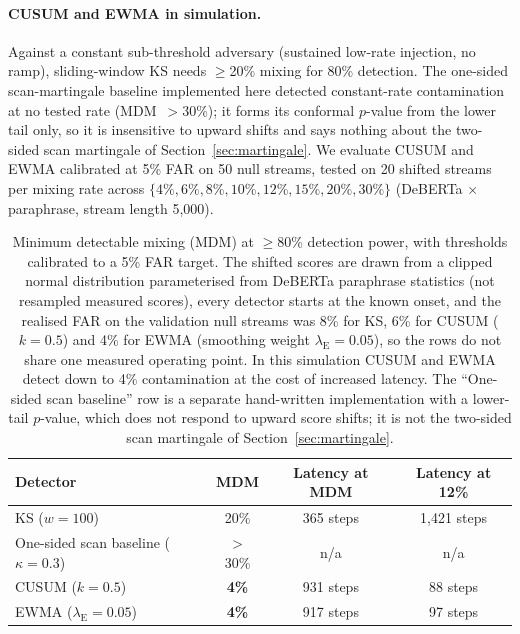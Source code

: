 \documentclass{article}
\begin{document}
\paragraph{CUSUM and EWMA in simulation.} Against a constant sub-threshold adversary (sustained low-rate injection, no ramp), sliding-window KS needs $\geq$20\% mixing for 80\% detection. The one-sided scan-martingale baseline implemented here detected constant-rate contamination at no tested rate (MDM~$>$30\%); it forms its conformal $p$-value from the lower tail only, so it is insensitive to upward shifts and says nothing about the two-sided scan martingale of Section~\ref{sec:martingale}. We evaluate CUSUM and EWMA calibrated at 5\% FAR on 50 null streams, tested on 20 shifted streams per mixing rate across $\{4\%, 6\%, 8\%, 10\%, 12\%, 15\%, 20\%, 30\%\}$ (DeBERTa $\times$ paraphrase, stream length 5{,}000).

\begin{table}[h]
\centering
\small
\caption{Minimum detectable mixing (MDM) at $\geq$80\% detection power, with thresholds calibrated to a 5\% FAR target. The shifted scores are drawn from a clipped normal distribution parameterised from DeBERTa paraphrase statistics (not resampled measured scores), every detector starts at the known onset, and the realised FAR on the validation null streams was 8\% for KS, 6\% for CUSUM ($k{=}0.5$) and 4\% for EWMA (smoothing weight $\lambda_{\text{E}}{=}0.05$), so the rows do not share one measured operating point. In this simulation CUSUM and EWMA detect down to 4\% contamination at the cost of increased latency. The ``One-sided scan baseline'' row is a separate hand-written implementation with a lower-tail $p$-value, which does not respond to upward score shifts; it is not the two-sided scan martingale of Section~\ref{sec:martingale}.}
\label{tab:subthreshold}
\begin{tabular}{lccc}
\toprule
\textbf{Detector} & \textbf{MDM} & \textbf{Latency at MDM} & \textbf{Latency at 12\%} \\
\midrule
KS ($w{=}100$) & 20\% & 365 steps & 1{,}421 steps \\
One-sided scan baseline ($\kappa{=}0.3$) & $>$30\% & n/a & n/a \\
CUSUM ($k{=}0.5$) & \textbf{4\%} & 931 steps & 88 steps \\
EWMA ($\lambda_{\text{E}}{=}0.05$) & \textbf{4\%} & 917 steps & 97 steps \\
\bottomrule
\end{tabular}
\end{table}
\end{document}
